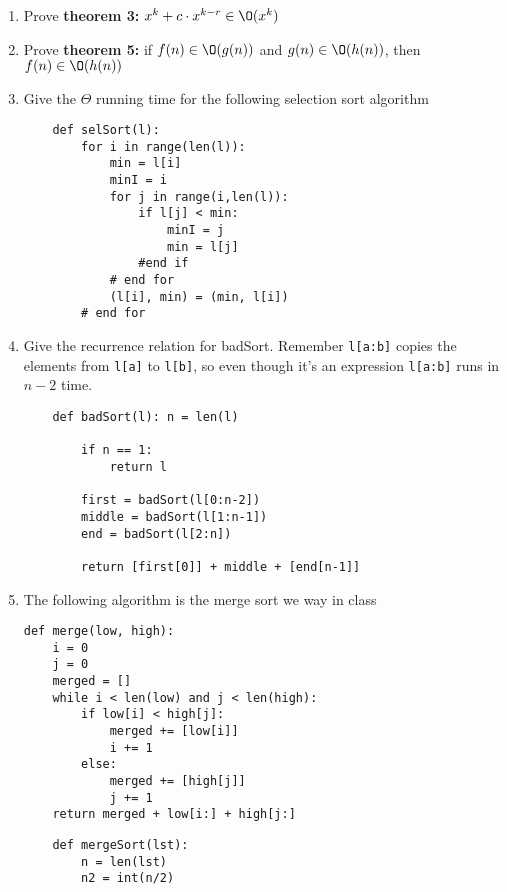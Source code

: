 \documentclass[basic, header]{nosvagor-notes}
\begin{document}
\begin{enumerate}[itemsep=4em]
  \item Prove \textbf{theorem 3:} $x^k + c\cdot x^{k-r} \in \O(x^k)$

  \item Prove \textbf{theorem 5:} if $f(n) \in \O(g(n))$ and $g(n) \in
    \O(h(n))$, then $f(n) \in \O(h(n))$

  \newpage %

  \item

    Give the $\Theta$ running time for the following selection sort algorithm
    \begin{verbatim}
    def selSort(l):
        for i in range(len(l)):
            min = l[i]
            minI = i
            for j in range(i,len(l)):
                if l[j] < min:
                    minI = j
                    min = l[j]
                #end if
            # end for
            (l[i], min) = (min, l[i])
        # end for
    \end{verbatim}

  \newpage %

  \item Give the recurrence relation for badSort. Remember \texttt{l[a:b]}
    copies the elements from \texttt{l[a]} to \texttt{l[b]}, so even though
    it's an expression \texttt{l[a:b]} runs in $n-2$ time.

    \begin{verbatim}
    def badSort(l): n = len(l)

        if n == 1:
            return l

        first = badSort(l[0:n-2])
        middle = badSort(l[1:n-1])
        end = badSort(l[2:n])

        return [first[0]] + middle + [end[n-1]]
    \end{verbatim}

  \newpage %

  \item The following algorithm is the merge sort we way in class

    \begin{multicols}{2}
      \begin{verbatim}
def merge(low, high):
    i = 0
    j = 0
    merged = []
    while i < len(low) and j < len(high):
        if low[i] < high[j]:
            merged += [low[i]]
            i += 1
        else:
            merged += [high[j]]
            j += 1
    return merged + low[i:] + high[j:]
      \end{verbatim}
      \vspace{5em}
      \begin{verbatim}
    def mergeSort(lst):
        n = len(lst)
        n2 = int(n/2)


\end{verbatim}
\end{multicols}
\end{enumerate}
\end{document}
